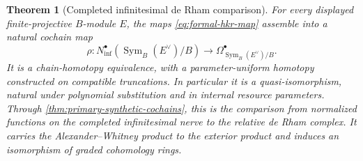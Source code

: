 \documentclass[11pt,a4paper]{article}
\numberwithin{algorithm}{section}
\numberwithin{equation}{section}
\newtheorem{theorem}{Theorem}[section]
\theoremstyle{definition}
\theoremstyle{remark}
\theoremstyle{plain}
\newcommand{\Sym}{\operatorname{Sym}}
\theoremstyle{definition}
\theoremstyle{plain}
\begin{document}
\begin{theorem}[Completed infinitesimal de Rham comparison]
\label{thm:de-rham-comparison}
For every displayed finite-projective $B$-module $E$, the maps
\eqref{eq:formal-hkr-map} assemble into a natural cochain map
\[
 \rho:N^\bullet_{\mathrm{inf}}(\Sym_B(E^\vee)/B)
  \longrightarrow\Omega^\bullet_{\Sym_B(E^\vee)/B}.
\]
It is a \emph{chain-homotopy equivalence}, with a parameter-uniform
homotopy constructed on compatible truncations.  In particular it
is a quasi-isomorphism, natural under polynomial substitution and
in internal resource parameters.  Through \cref{thm:primary-synthetic-cochains}, this is the
comparison from normalized functions on the completed infinitesimal
nerve to the relative de Rham complex.  It carries the
Alexander--Whitney product to the exterior product and induces
an isomorphism of graded cohomology rings.
\end{theorem}
\end{document}
